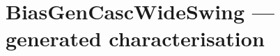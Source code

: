 \documentclass[11pt]{article}
\begin{document}
\section*{BiasGenCascWideSwing --- generated characterisation}

\end{document}
